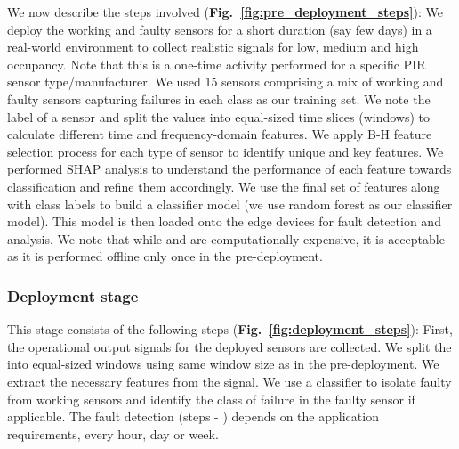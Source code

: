 We now describe the steps involved ({\bfseries Fig.~\ref{fig:pre_deployment_steps}}):
%
 We deploy the working and faulty sensors for a short duration (say few days) in a real-world environment to collect realistic \aout signals for low, medium and high occupancy. 
%
Note that this is a one-time activity performed for a specific PIR sensor type/manufacturer. 
We used 15 sensors comprising a mix of working and faulty sensors capturing failures in each class as our training set.
%
 We note the label of a sensor and split the \aout values into equal-sized time slices (windows) to calculate different time and frequency-domain features. 
%
 We apply B-H feature selection process for each type of sensor to identify unique and key features. 
%
 We performed SHAP analysis to understand the performance of each feature towards classification and refine them accordingly. 
%
 We use the final set of features along with class labels to build a classifier model (we use random forest as our classifier model). This model is then loaded onto the edge devices for fault detection and analysis. We note that while  and  are computationally expensive, it is acceptable as it is performed offline only once in the pre-deployment.

\subsubsection{Deployment stage} 
This stage consists of the following steps ({\bfseries Fig.~\ref{fig:deployment_steps}}): 
%
 First, the operational \aout output signals for the deployed sensors are collected. 
%
 We split the \aout into equal-sized windows using same window size as in the pre-deployment. 
%
 We extract the necessary features from the \aout signal. 
%
 We use a classifier to \ca isolate faulty from working sensors and \cb identify the class of failure in the faulty sensor if applicable. %
The fault detection (steps  - ) depends on the application requirements, \ie every hour, day or week. 

